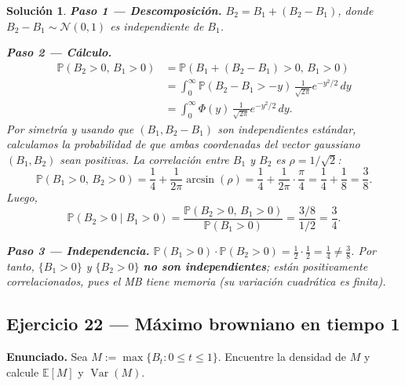 \documentclass[12pt,letterpaper]{article}
\theoremstyle{ejercicio}
\theoremstyle{solucion}
\newtheorem*{solucion}{Solución}
\newcommand{\E}{\mathbb{E}}
\newcommand{\Var}{\operatorname{Var}}
\renewcommand{\P}{\mathbb{P}}
\begin{document}
\begin{solucion}

\textbf{Paso 1 — Descomposición.}
$B_2 = B_1 + (B_2-B_1)$, donde $B_2-B_1\sim\mathcal{N}(0,1)$ es independiente de $B_1$.

\textbf{Paso 2 — Cálculo.}
\begin{align*}
  \P(B_2>0,\,B_1>0)
  &= \P(B_1+(B_2-B_1)>0,\,B_1>0)\\
  &= \int_0^\infty\P(B_2-B_1>-y)\,\frac{1}{\sqrt{2\pi}}e^{-y^2/2}\,dy\\
  &= \int_0^\infty\Phi(y)\,\frac{1}{\sqrt{2\pi}}e^{-y^2/2}\,dy.
\end{align*}
Por simetría y usando que $(B_1,B_2-B_1)$ son independientes estándar, calculamos la
probabilidad de que ambas coordenadas del vector gaussiano $(B_1,B_2)$ sean positivas.
La correlación entre $B_1$ y $B_2$ es $\rho=1/\sqrt{2}$:
\[
  \P(B_1>0,\,B_2>0) = \frac{1}{4}+\frac{1}{2\pi}\arcsin(\rho)
  = \frac{1}{4}+\frac{1}{2\pi}\cdot\frac{\pi}{4}=\frac{1}{4}+\frac{1}{8}=\frac{3}{8}.
\]
Luego,
\[
  \P(B_2>0\mid B_1>0) = \frac{\P(B_2>0,\,B_1>0)}{\P(B_1>0)} = \frac{3/8}{1/2} = \frac{3}{4}.
\]

\textbf{Paso 3 — Independencia.}
$\P(B_1>0)\cdot\P(B_2>0) = \frac{1}{2}\cdot\frac{1}{2}=\frac{1}{4}\ne\frac{3}{8}$.
Por tanto, $\{B_1>0\}$ y $\{B_2>0\}$ \textbf{no son independientes}; están positivamente
correlacionados, pues el MB tiene memoria (su variación cuadrática es finita).
\end{solucion}

\subsection*{Ejercicio 22 — Máximo browniano en tiempo 1}

\begin{recuadro}
\textbf{Enunciado.} Sea $M:=\max\{B_t:0\le t\le 1\}$. Encuentre la densidad de $M$
y calcule $\E[M]$ y $\Var(M)$.
\end{recuadro}
\end{document}
